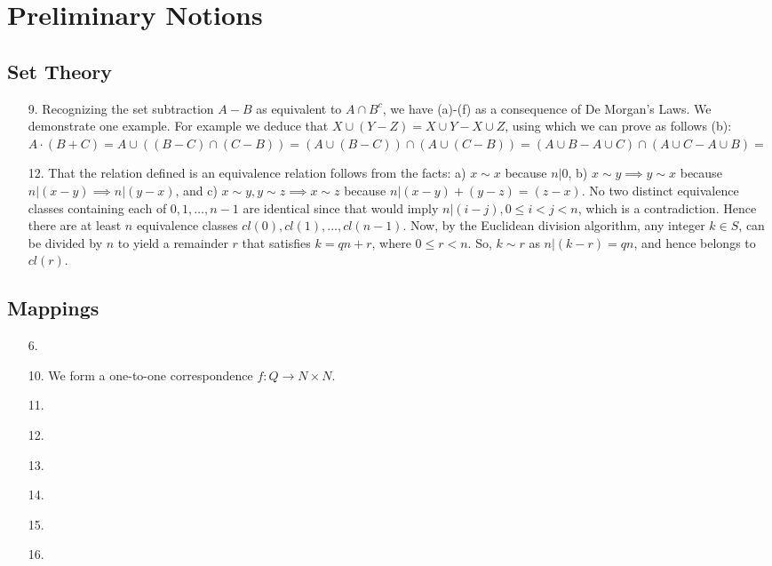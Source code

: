 \section{Preliminary Notions}
\subsection{Set Theory}
\begin{enumerate}
\item[9.] Recognizing the set subtraction $A-B$ as equivalent to $A \cap B^c$,
we have (a)-(f) as a consequence of De Morgan's Laws. We demonstrate one
example. For example we deduce that $X \cup (Y - Z) = X \cup Y - X \cup Z$,
using which we can prove as follows (b): $A \cdot (B + C) = A \cup ((B-C) \cap
(C-B)) = (A \cup (B-C)) \cap (A \cup (C-B)) = (A \cup B-A \cup C) \cap (A \cup
C - A \cup B) = $

\item[12.] That the relation defined is an equivalence relation follows
from the facts: a) $x \sim x$ because $n | 0$, b) $x \sim y \implies y
\sim x$ because $n | (x-y) \implies n | (y-x)$, and c) $x \sim y, y \sim
z \implies x \sim z$ because $n | (x-y) + (y-z) = (z-x)$. No two
distinct equivalence classes containing each of $0, 1, \dots, n-1$ are
identical since that would imply $n | (i - j), 0 \leq i < j < n$, which
is a contradiction.  Hence there are at least $n$ equivalence classes
$cl(0), cl(1), \dots, cl(n-1)$. Now, by the Euclidean division
algorithm, any integer $k \in S$, can be divided by $n$ to yield a
remainder $r$ that satisfies $k = qn + r$, where $0 \leq r < n$. So, $k
\sim r$ as $n | (k-r) = qn$, and hence belongs to $cl(r)$.
\end{enumerate}

\subsection{Mappings}
\begin{enumerate}
\item[6.]
\item[10.] We form a one-to-one correspondence $f:Q \to N \times N$.
\item[11.]
\item[12.]
\item[13.]
\item[14.]
\item[15.]
\item[16.]
\end{enumerate}

\subsection{}
\begin{enumerate}
\item[]
\end{enumerate}
